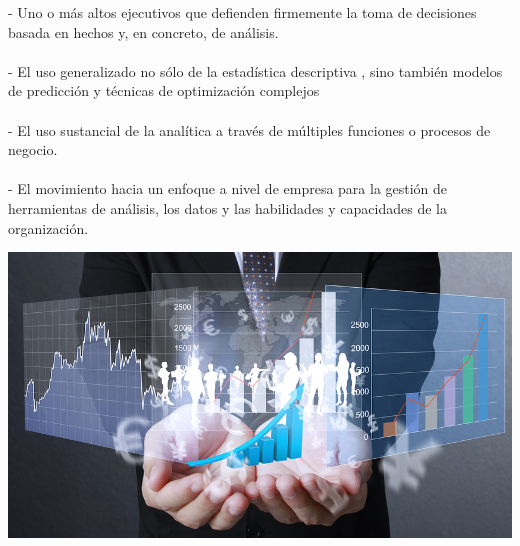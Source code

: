 \begin{enumerate}[3.]
	- Uno o más altos ejecutivos que defienden firmemente la toma de decisiones basada en hechos y, en concreto, de análisis.
\\
\\
	- El uso generalizado no sólo de la estadística descriptiva , sino también modelos de predicción y técnicas de optimización complejos
\\
\\
	- El uso sustancial de la analítica a través de múltiples funciones o procesos de negocio.
\\
\\
	- El movimiento hacia un enfoque a nivel de empresa para la gestión de herramientas de análisis, los datos y las habilidades y capacidades de la organización.



\end{enumerate}

\begin{center}
\includegraphics[scale=0.55]{./Imagenes/ba2.jpg}
\end{center}


